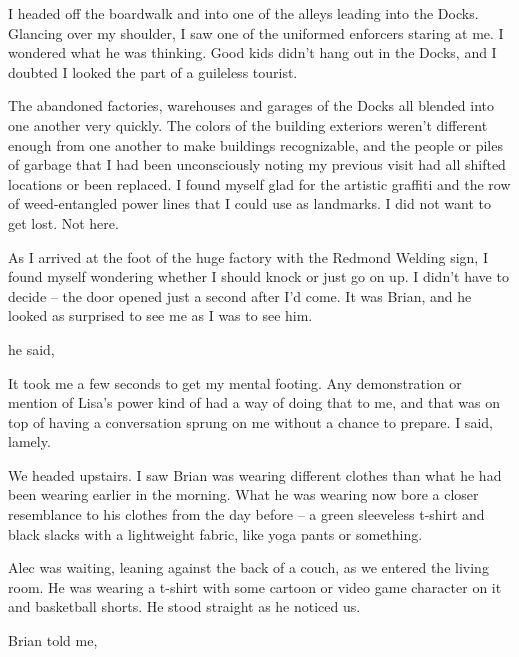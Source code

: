 I headed off the boardwalk and into one of the alleys leading into the Docks. Glancing over my shoulder, I saw one of the uniformed enforcers staring at me. I wondered what he was thinking. Good kids didn't hang out in the Docks, and I doubted I looked the part of a guileless tourist.

The abandoned factories, warehouses and garages of the Docks all blended into one another very quickly. The colors of the building exteriors weren't different enough from one another to make buildings recognizable, and the people or piles of garbage that I had been unconsciously noting my previous visit had all shifted locations or been replaced. I found myself glad for the artistic graffiti and the row of weed-entangled power lines that I could use as landmarks. I did not want to get lost. Not here.

As I arrived at the foot of the huge factory with the Redmond Welding sign, I found myself wondering whether I should knock or just go on up. I didn't have to decide -- the door opened just a second after I'd come. It was Brian, and he looked as surprised to see me as I was to see him.

 he said, 

It took me a few seconds to get my mental footing. Any demonstration or mention of Lisa's power kind of had a way of doing that to me, and that was on top of having a conversation sprung on me without a chance to prepare.  I said, lamely.


We headed upstairs. I saw Brian was wearing different clothes than what he had been wearing earlier in the morning. What he was wearing now bore a closer resemblance to his clothes from the day before -- a green sleeveless t-shirt and black slacks with a lightweight fabric, like yoga pants or something.

Alec was waiting, leaning against the back of a couch, as we entered the living room. He was wearing a t-shirt with some cartoon or video game character on it and basketball shorts. He stood straight as he noticed us.

 Brian told me, 

